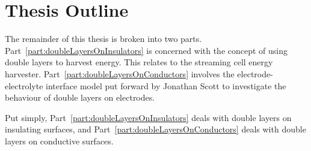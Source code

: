 \section{Thesis Outline}
  
  The remainder of this thesis is broken into two parts.
  Part~\ref{part:doubleLayersOnInsulators} is concerned with the concept of using double layers to harvest energy.
  This relates to the streaming cell energy harvester.
  Part~\ref{part:doubleLayersOnConductors} involves the electrode-electrolyte interface model put forward by Jonathan Scott to investigate the behaviour of double layers on electrodes.

  Put simply, Part~\ref{part:doubleLayersOnInsulators} deals with double layers on insulating surfaces, and Part~\ref{part:doubleLayersOnConductors} deals with double layers on conductive surfaces.

  
